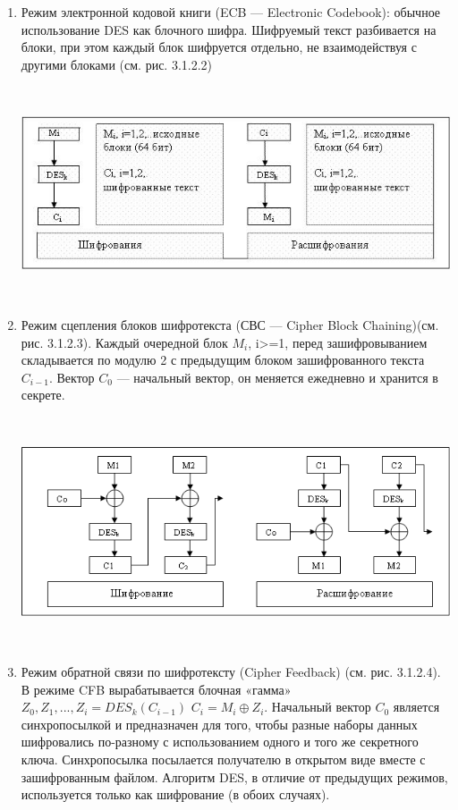 \documentclass[a4paper]{report}
\begin{document}
\begin{enumerate}
\item Режим электронной кодовой книги (ECB — Electronic Codebook): обычное использование DES как блочного шифра. Шифруемый текст разбивается на блоки, при этом каждый блок шифруется отдельно, не взаимодействуя с другими блоками (см. рис. 3.1.2.2)

~

\includegraphics[scale=1.2]{ECB1}
{\\}

~


\item Режим сцепления блоков шифротекста (СВС — Cipher Block Chaining)(см. рис. 3.1.2.3). Каждый очередной блок $M_{i}$, i>=1, перед зашифровыванием складывается по модулю 2 с предыдущим блоком зашифрованного текста $C_{i-1}$. Вектор $C_{0}$ — начальный вектор, он меняется ежедневно и хранится в секрете.

~

\includegraphics[scale=1.1]{CBC}
{\\}

~

\item Режим обратной связи по шифротексту (Cipher Feedback) (см. рис. 3.1.2.4). В режиме CFB вырабатывается блочная «гамма» $Z_{0},Z_{1},...,Z_{i}=DES_{k}(C_{i-1})$ $C_{i} = M_{i}\oplus Z_{i}$. Начальный вектор $C_{0}$ является синхропосылкой и предназначен для того, чтобы разные наборы данных шифровались по-разному с использованием одного и того же секретного ключа. Синхропосылка посылается получателю в открытом виде вместе с зашифрованным файлом. Алгоритм DES, в отличие от предыдущих режимов, используется только как шифрование (в обоих случаях).


\end{enumerate}
\end{document}
